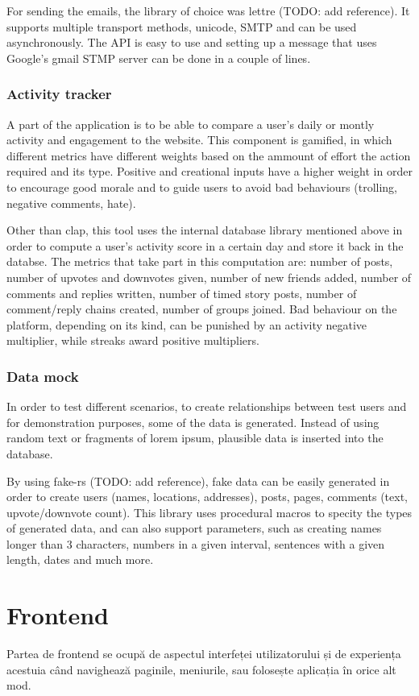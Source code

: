     For sending the emails, the library of choice was lettre (TODO: add reference). It supports multiple transport methods, unicode, SMTP and can be used asynchronously. The API is easy to use and setting up a message that uses Google's gmail STMP server can be done in a couple of lines.
    
    \subsubsection{Activity tracker}
    A part of the application is to be able to compare a user's daily or montly activity and engagement to the website. This component is gamified, in which different metrics have different weights based on the ammount of effort the action required and its type. Positive and creational inputs have a higher weight in order to encourage good morale and to guide users to avoid bad behaviours (trolling, negative comments, hate).

    Other than clap, this tool uses the internal database library mentioned above in order to compute a user's activity score in a certain day and store it back in the databse. The metrics that take part in this computation are: number of posts, number of upvotes and downvotes given, number of new friends added, number of comments and replies written, number of timed story posts, number of comment/reply chains created, number of groups joined. Bad behaviour on the platform, depending on its kind, can be punished by an activity negative multiplier, while streaks award positive multipliers.
    
    \subsubsection{Data mock}
    In order to test different scenarios, to create relationships between test users and for demonstration purposes, some of the data is generated. Instead of using random text or fragments of lorem ipsum, plausible data is inserted into the database.

    By using fake-rs (TODO: add reference), fake data can be easily generated in order to create users (names, locations, addresses), posts, pages, comments (text, upvote/downvote count). This library uses procedural macros to specity the types of generated data, and can also support parameters, such as creating names longer than 3 characters, numbers in a given interval, sentences with a given length, dates and much more.

    \section{Frontend}
    \label{Frontend}
    Partea de frontend se ocupă de aspectul interfeței utilizatorului și de experiența acestuia când navighează paginile, meniurile, sau folosește aplicația în orice alt mod.
